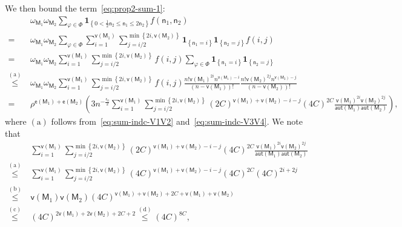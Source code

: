 \documentclass[letterpaper,11pt]{article}
\theoremstyle{definition}
\newcommand{\en}{\mathsf{{e}}}
\newcommand{\vn}{\mathsf{{v}}}
\newcommand{\pth}[1]{\left( #1 \right)}
\newcommand{\sth}[1]{\left\{ #1 \right\}}
\newcommand{\sfM}{{\mathsf{M}}}
\newcommand{\sfn}{{\mathsf{n}}}
\newcommand{\indc}[1]{{\mathbf{1}_{\left\{{#1}\right\}}}}
\newcommand{\aut}{\mathsf{aut}}
\newcommand{\vp}{\varphi}
\begin{document}
We then bound the term~\eqref{eq:prop2-sum-1}: \begin{align}
    \nonumber &~\omega_{\sfM_1}\omega_{\sfM_2}\sum_{\vp\in \Phi} \indc{0<\frac{1}{2}\sfn_2\le \sfn_1\le 2\sfn_2} f(\sfn_1,\sfn_2)\\ \nonumber=&~ \omega_{\sfM_1}\omega_{\sfM_2}\sum_{\vp\in \Phi}\sum_{i=1}^{\vn(\sfM_1)} \sum_{j=i/2}^{\min\sth{2i,\vn(\sfM_2)}} \indc{\sfn_1=i}\indc{\sfn_2=j} f(i,j)\\ \nonumber
    =&~\omega_{\sfM_1}\omega_{\sfM_2}\sum_{i=1}^{\vn(\sfM_1)} \sum_{j=i/2}^{\min\sth{2i,\vn(\sfM_2)}} f(i,j)\sum_{\vp\in \Phi}\indc{\sfn_1=i}\indc{\sfn_2=j}\\ \nonumber
    \overset{\mathrm{(a)}}{\le}&~\omega_{\sfM_1}\omega_{\sfM_2}\sum_{i=1}^{\vn(\sfM_1)} \sum_{j=i/2}^{\min\sth{2i,\vn(\sfM_2)}} f(i,j) \frac{n!\vn(\sfM_1)^{2i}n^{\vn(\sfM_1)-i}}{(n-\vn(\sfM_1))!}\frac{n!\vn(\sfM_2)^{2j}n^{\vn(\sfM_2)-j}}{(n-\vn(\sfM_2))!}\\\label{eq:prop2-sum-4}=&~\rho^{\en(\sfM_1)+\en(\sfM_2)}\pth{ 3n^{-\tfrac{\epsilon_0}{2}}\sum_{i=1}^{\vn(\sfM_1)}\sum_{j=i/2}^{\min\sth{2i,\vn(\sfM_2)}} \pth{2C}^{\vn(\sfM_1)+\vn(\sfM_2)-i-j}  \pth{4C}^{2C} \frac{\vn(\sfM_1)^{2i}\vn(\sfM_2)^{2j}}{\aut(\sfM_1)\aut(\sfM_2)}},
\end{align}
where $\mathrm{(a)}$ follows from~\eqref{eq:sum-indc-V1V2} and~\eqref{eq:sum-indc-V3V4}.
We note that \begin{align*}
    &~\sum_{i=1}^{\vn(\sfM_1)}\sum_{j=i/2}^{\min\sth{2i,\vn(\sfM_2)}} \pth{2C}^{\vn(\sfM_1)+\vn(\sfM_2)-i-j}  \pth{4C}^{2C} \frac{\vn(\sfM_1)^{2i}\vn(\sfM_2)^{2j}}{\aut(\sfM_1)\aut(\sfM_2)} \\
    \overset{\mathrm{(a)}}{\le}&~\sum_{i=1}^{\vn(\sfM_1)}\sum_{j=i/2}^{\min\sth{2i,\vn(\sfM_2)}}\pth{4C}^{\vn(\sfM_1)+\vn(\sfM_2)-i-j}\pth{4C}^{2C} \pth{4C}^{2i+2j}\\
    \overset{\mathrm{(b)}}{\le}&~\vn(\sfM_1)\vn(\sfM_2)\pth{4C}^{\vn(\sfM_1)+\vn(\sfM_2)+2C+\vn(\sfM_1)+\vn(\sfM_2)}\\
    \overset{\mathrm{(c)}}{\le}&~  \pth{4C}^{2\vn(\sfM_1)+2\vn(\sfM_2)+2C+2}\overset{\mathrm{(d)}}{\le} (4C)^{8C},
\end{align*}
\end{document}
